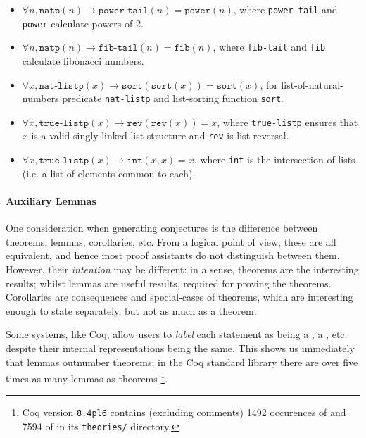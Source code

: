 {\begin{itemize}
  \item $\forall n, \texttt{natp}(n) \rightarrow \texttt{power-tail}(n) = \texttt{power}(n)$,  where \texttt{power-tail} and \texttt{power} calculate powers of 2.

  \item $\forall n, \texttt{natp}(n) \rightarrow \texttt{fib-tail}(n) = \texttt{fib}(n)$,  where \texttt{fib-tail} and \texttt{fib} calculate fibonacci numbers.

  \item $\forall x, \texttt{nat-listp}(x) \rightarrow \texttt{sort}(\texttt{sort}(x)) = \texttt{sort}(x)$, for list-of-natural-numbers predicate \texttt{nat-listp} and list-sorting function \texttt{sort}.

  \item $\forall x, \texttt{true-listp}(x) \rightarrow \texttt{rev}(\texttt{rev}(x)) = x$, where \texttt{true-listp} ensures that $x$ is a valid singly-linked list structure and \texttt{rev} is list reversal.

  \item $\forall x, \texttt{true-listp}(x) \rightarrow \texttt{int}(x, x) = x$, where \texttt{int} is the intersection of lists (i.e. a list of elements common to each).

\end{itemize}

\paragraph{Auxiliary Lemmas} \label{sec:auxiliarylemmas}

One consideration when generating conjectures is the difference between
theorems, lemmas, corollaries, etc. From a logical point of view, these are all
equivalent, and hence most proof assistants do not distinguish between
them. However, their \emph{intention} may be different: in a sense, theorems are
the interesting results; whilst lemmas are useful results, required for proving
the theorems. Corollaries are consequences and special-cases of theorems, which
are interesting enough to state separately, but not as much as a theorem.

Some systems, like Coq, allow users to \emph{label} each statement as being a
, a , etc. despite their internal representations being
the same. This shows us immediately that lemmas outnumber theorems; in the Coq
standard library there are over five times as many lemmas as theorems
\footnote{Coq version \texttt{8.4pl6} contains (excluding comments) 1492
  occurences of  and 7594 of  in its \texttt{theories/}
  directory.}.

}
